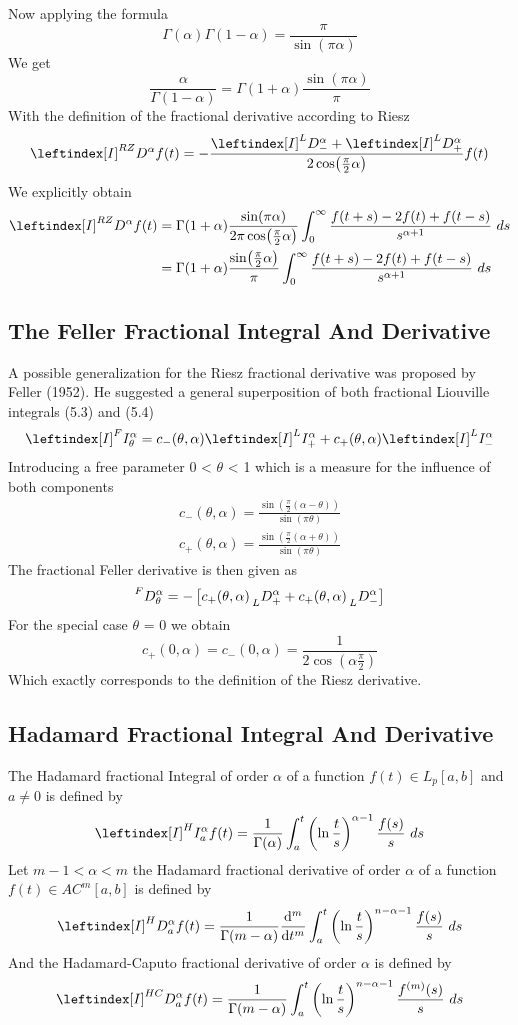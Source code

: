 Now applying the formula
\[
    \Gamma(\alpha)\Gamma(1-\alpha) = \frac{\pi}{\sin(\pi \alpha)}
\]
We get 
\[
    \frac{\alpha}{\Gamma(1-\alpha)} = \Gamma(1+\alpha) \frac{\sin(\pi \alpha)}{\pi}
\]
With the definition of the fractional derivative according to Riesz
\[
\leftindex[I]^{RZ} {D^{\alpha}} f(t) = - \frac{\leftindex[I]^L {D_{-}^{\alpha}} + \leftindex[I]^L {D_{+}^{\alpha}}}{2 \cos(\frac{\pi}{2}\alpha)} f(t)
\]
We explicitly obtain
\begin{align*}
    \leftindex[I]^{RZ} {D^{\alpha}} f(t) &= \Gamma(1+\alpha) \frac{\sin(\pi \alpha)}{2\pi \cos(\frac{\pi}{2}\alpha)} \int_{0}^{\infty} \frac{f(t+s) -2f(t) + f(t-s)}{s^{\alpha+1}} \hquad ds
    \\
    &= \Gamma(1+\alpha) \frac{\sin(\frac{\pi}{2}\alpha)}{\pi} \int_{0}^{\infty} \frac{f(t+s) -2f(t) + f(t-s)}{s^{\alpha+1}} \hquad ds
\end{align*}


\subsection{The Feller Fractional Integral And Derivative}
A possible generalization for the Riesz fractional derivative was proposed
by Feller (1952). He suggested a general superposition of both
fractional Liouville integrals (5.3) and (5.4)
\[
    \leftindex[I]^{F} {I_{\theta}^{\alpha}} = c_-(\theta,\alpha) \leftindex[I]^L {I_{+}^{\alpha}} + c_+(\theta,\alpha) \leftindex[I]^L {I_{-}^{\alpha}}
\]
Introducing a free parameter 0 < $\theta$ < 1 which is a measure for the influence of both components
\begin{align*}
    c_-(\theta,\alpha) = \frac{\sin(\frac{\pi}{2}(\alpha-\theta))}{\sin(\pi \theta)}
    \\
    c_+(\theta,\alpha) = \frac{\sin(\frac{\pi}{2}(\alpha+\theta))}{\sin(\pi \theta)}
\end{align*}
The fractional Feller derivative is then given as
\[
    \prescript{F}{}{D_{\theta}^{\alpha}} = - \left[c_+(\theta,\alpha) \prescript{}{L}{D_{+}^{\alpha}} + c_+(\theta,\alpha) \prescript{}{L}{D_{-}^{\alpha}}\right]
\]
For the special case $\theta$ = 0 we obtain
\[
    c_+(0,\alpha) = c_-(0,\alpha) = \frac{1}{2 \cos(\alpha \frac{\pi}{2})}
\]
Which exactly corresponds to the definition of the Riesz derivative.
\subsection{Hadamard Fractional Integral And Derivative}
The Hadamard fractional Integral of order $\alpha$ of a function $f(t) \in L_p[a,b]$ and $a \neq 0$ is defined by 
\[
    \leftindex[I]^H {I_a^{\alpha}} f(t) = \frac{1}{\Gamma(\alpha)} \int_{a}^{t} \left(\ln \frac{t}{s}\right)^{\alpha-1} \frac{f(s)}{s} \hquad ds
\]
Let $m-1 < \alpha < m$ the Hadamard fractional derivative of order $\alpha$
of a function $f(t) \in AC^m[a,b]$ is defined by 
\[
    \leftindex[I]^H {D_a^{\alpha}} f(t) = \frac{1}{\Gamma(m-\alpha)} \dv[m]{}{t} \int_{a}^{t} \left(\ln \frac{t}{s}\right)^{n-\alpha-1} \frac{f(s)}{s} \hquad ds
\]
And the Hadamard-Caputo fractional derivative of order $\alpha$ is defined by 
\[
    \leftindex[I]^{HC} {D_a^{\alpha}} f(t) = \frac{1}{\Gamma(m-\alpha)} \int_{a}^{t} \left(\ln \frac{t}{s}\right)^{n-\alpha-1} \frac{f^{(m)}(s)}{s} \hquad ds
\]
\newpage
